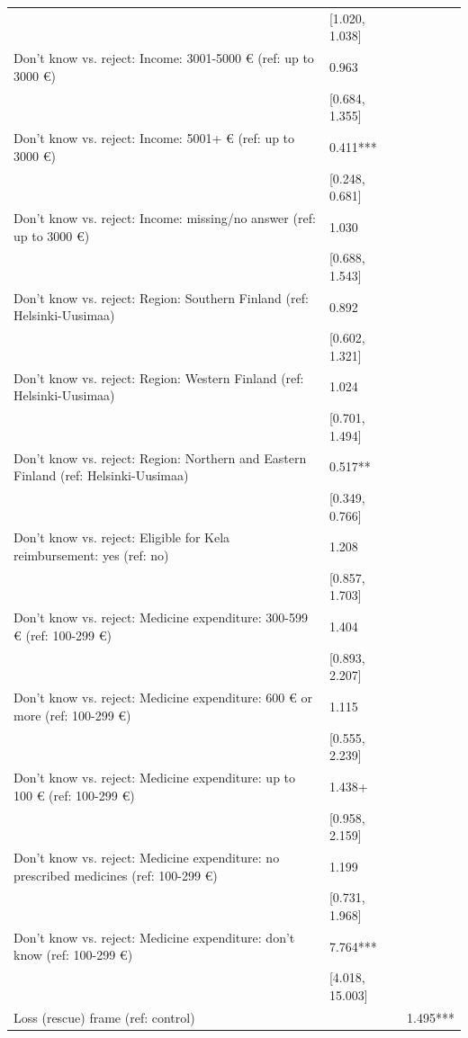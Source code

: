 \begin{tabular}{lll}
& [\num{1.020}, \num{1.038}] &  \\
Don't know vs. reject: Income: 3001-5000 € (ref: up to 3000 €) & \num{0.963} &  \\
& [\num{0.684}, \num{1.355}] &  \\
Don't know vs. reject: Income: 5001+ € (ref: up to 3000 €) & \num{0.411}*** &  \\
& [\num{0.248}, \num{0.681}] &  \\
Don't know vs. reject: Income: missing/no answer (ref: up to 3000 €) & \num{1.030} &  \\
& [\num{0.688}, \num{1.543}] &  \\
Don't know vs. reject: Region: Southern Finland (ref: Helsinki-Uusimaa) & \num{0.892} &  \\
& [\num{0.602}, \num{1.321}] &  \\
Don't know vs. reject: Region: Western Finland (ref: Helsinki-Uusimaa) & \num{1.024} &  \\
& [\num{0.701}, \num{1.494}] &  \\
Don't know vs. reject: Region: Northern and Eastern Finland (ref: Helsinki-Uusimaa) & \num{0.517}** &  \\
& [\num{0.349}, \num{0.766}] &  \\
Don't know vs. reject: Eligible for Kela reimbursement: yes (ref: no) & \num{1.208} &  \\
& [\num{0.857}, \num{1.703}] &  \\
Don't know vs. reject: Medicine expenditure: 300-599 € (ref: 100-299 €) & \num{1.404} &  \\
& [\num{0.893}, \num{2.207}] &  \\
Don't know vs. reject: Medicine expenditure: 600 € or more (ref: 100-299 €) & \num{1.115} &  \\
& [\num{0.555}, \num{2.239}] &  \\
Don't know vs. reject: Medicine expenditure: up to 100 € (ref: 100-299 €) & \num{1.438}+ &  \\
& [\num{0.958}, \num{2.159}] &  \\
Don't know vs. reject: Medicine expenditure: no prescribed medicines (ref: 100-299 €) & \num{1.199} &  \\
& [\num{0.731}, \num{1.968}] &  \\
Don't know vs. reject: Medicine expenditure: don't know (ref: 100-299 €) & \num{7.764}*** &  \\
& [\num{4.018}, \num{15.003}] &  \\
Loss (rescue) frame (ref: control) &  & \num{1.495}*** \\

\end{tabular}
